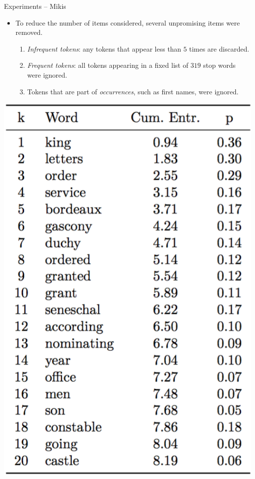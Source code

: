 \documentclass[12pt]{beamer}
\theoremstyle{break}
\begin{document}


\begin{frame}{Experiments -- Mikis}

	\begin{itemize}
		\item To reduce the number of items considered, several unpromising items were removed. \begin{enumerate}
    			\item \emph{Infrequent tokens}: any tokens that appear less than $5$ times are discarded.
    			\item \emph{Frequent tokens}: all tokens appearing in a fixed list of $319$ stop words were ignored.
    			\item Tokens that are part of \emph{occurrences}, such as first names, were ignored.
				\end{enumerate}	
	\end{itemize}
\end{frame}




\begin{frame}
	\centering
	\includegraphics[width=\textwidth]{images/pic1}

\end{frame}
\end{document}
